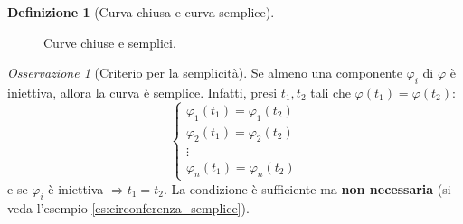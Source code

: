 \documentclass[11pt, a4paper, openright]{book}
\theoremstyle{plain}
\theoremstyle{definition}
\newtheorem{definizione}[teorema]{Definizione}
\theoremstyle{remark}
\newtheorem{osservazione}[teorema]{Osservazione}
\begin{document}
\begin{definizione}[Curva chiusa e curva semplice]
\begin{figure}[H]
    \caption{Curve chiuse e semplici.}
\end{figure}
\end{definizione}

\begin{osservazione}[Criterio per la semplicità]
    Se almeno una componente $\varphi_i$ di $\varphi$ è iniettiva, allora la curva è semplice. Infatti, presi $t_1, t_2$ tali che $\varphi(t_1) = \varphi(t_2)$:
    \begin{equation}
        \begin{cases}
            \varphi_1(t_1) = \varphi_1(t_2) \\
            \varphi_2(t_1) = \varphi_2(t_2) \\
            \vdots \\
            \varphi_n(t_1) = \varphi_n(t_2)
        \end{cases}
    \end{equation}
    e se $\varphi_i$ è iniettiva $\Longrightarrow t_1 = t_2$. La condizione è sufficiente ma \textbf{non necessaria} (si veda l'esempio \ref{es:circonferenza_semplice}).
\end{osservazione}
\end{document}
